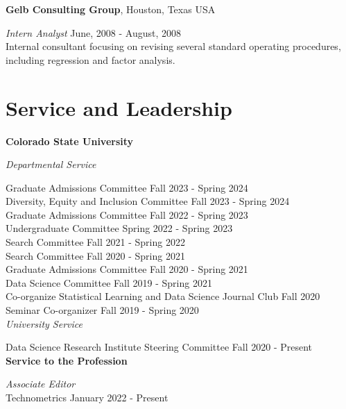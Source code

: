 \documentclass[margin,line]{res}
\begin{document}
\begin{resume}
{\bf Gelb Consulting Group}, Houston, Texas USA

\vspace{-.3cm}
{\em Intern Analyst} \hfill {June, 2008 - August, 2008}\\
Internal consultant focusing on revising several standard operating procedures, including regression and factor analysis. 

\section{\sc Service and Leadership}

{\bf Colorado State University}

\vspace{-.3cm}
{\em Departmental Service}

\vspace{-.3cm}
Graduate Admissions Committee \hfill {Fall 2023 - Spring 2024} \\
Diversity, Equity and Inclusion Committee \hfill {Fall 2023 - Spring 2024} \\
Graduate Admissions Committee \hfill {Fall 2022 - Spring 2023} \\
Undergraduate Committee \hfill {Spring 2022 - Spring 2023} \\
Search Committee \hfill {Fall 2021 - Spring 2022} \\
Search Committee \hfill {Fall 2020 - Spring 2021} \\
Graduate Admissions Committee \hfill {Fall 2020 - Spring 2021} \\
Data Science Committee \hfill {Fall 2019 - Spring 2021} \\
Co-organize Statistical Learning and Data Science Journal Club \hfill {Fall 2020} \\
Seminar Co-organizer \hfill {Fall 2019 - Spring 2020} \\

\vspace{-.3cm}
{\em University Service}

\vspace{-.3cm}
Data Science Research Institute Steering Committee \hfill {Fall 2020 - Present} \\

{\bf Service to the Profession}

\vspace{-.3cm}
{\em Associate Editor}  \\
\vspace{-.3cm}
Technometrics \hfill {January 2022 - Present} \\



\end{resume}
\end{document}
